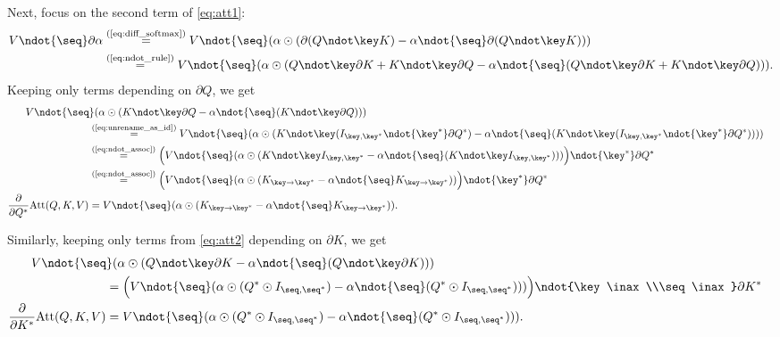 Next, focus on the second term of \cref{eq:att1}:
\begin{align}
V \ndot{\seq} \partial \attwt
&\eqby{eq:diff_softmax} V \ndot{\seq} (\attwt \odot (\partial (\qk) - \attwt \ndot{\seq} \partial (\qk))) \notag \\
&\eqby{eq:ndot_rule} V \ndot{\seq} (\attwt \odot (Q \ndot\key \partial K + K \ndot\key \partial Q - \attwt \ndot{\seq} (Q \ndot\key \partial K + K \ndot\key \partial Q))). \label{eq:att2}
\end{align}
Keeping only terms depending on $\partial Q$, we get
\begin{align*}
\firsteq{V \ndot{\seq} (\attwt \odot (K \ndot\key \partial Q - \attwt \ndot{\seq} (K \ndot\key \partial Q)))}
&\eqby{eq:unrename_as_id} V \ndot{\seq} (\attwt \odot (K \ndot\key (I_{\key,\key\inax} \ndot{\key\inax} \partial Q\inax) - \attwt \ndot{\seq} (K \ndot\key (I_{\key,\key\inax} \ndot{\key\inax} \partial Q\inax)))) \\
&\eqby{eq:ndot_assoc} \Bigl(V \ndot{\seq} (\attwt \odot (K \ndot\key I_{\key,\key\inax} - \attwt \ndot{\seq} (K \ndot\key I_{\key,\key\inax})))\Bigr) \ndot{\key\inax} \partial Q\inax \\
&\eqby{eq:ndot_assoc} \Bigl(V \ndot{\seq} (\attwt \odot (K_{\key\rightarrow\key\inax} - \attwt \ndot{\seq} K_{\key\rightarrow\key\inax}))\Bigr) \ndot{\key\inax} \partial Q\inax \\
  \frac{\partial}{\partial Q\inax}
  \text{Att}(Q, K, V) &= V \ndot{\seq} (\attwt \odot (K_{\key\rightarrow\key\inax} - \attwt \ndot{\seq} K_{\key\rightarrow\key\inax})).
\end{align*}

Similarly, keeping only terms from \cref{eq:att2} depending on $\partial K$, we get
\begin{align*}
\firsteq{V \ndot{\seq} (\attwt \odot (Q \ndot\key \partial K - \attwt \ndot{\seq} (Q \ndot\key \partial K)))}
&= \Bigl(V \ndot{\seq} (\attwt \odot (Q\inax \odot I_{\seq,\seq\inax}) - \attwt \ndot{\seq} (Q\inax \odot I_{\seq,\seq\inax})))\Bigr) \ndot{\key\inax\\\seq\inax} \partial K\inax \\
  \frac{\partial}{\partial K\inax}
  \text{Att}(Q, K, V) &= V \ndot{\seq} (\attwt \odot (Q\inax \odot I_{\seq,\seq\inax}) - \attwt \ndot{\seq} (Q\inax \odot I_{\seq,\seq\inax}))).
\end{align*}
